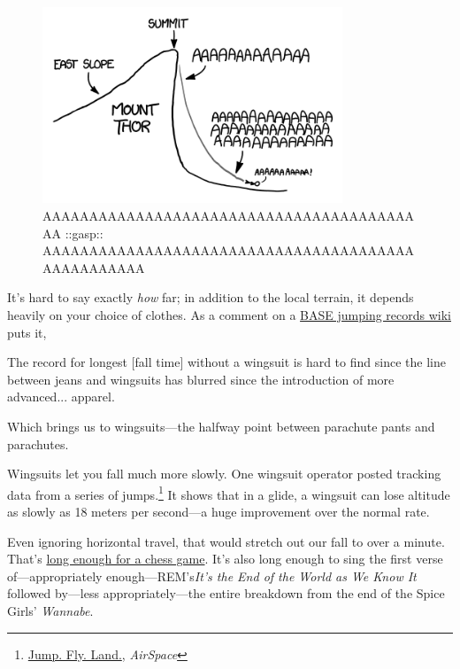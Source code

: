 {\begin{figure}[!htbp]
\centering
\includegraphics[scale=0.5, max width=0.8\textwidth]{imgs/a/51/freefall_extended.png}
\caption{AAAAAAAAAAAAAAAAAAAAAAAAAAAAAAAAAAAAAAAAAA ::gasp:: AAAAAAAAAAAAAAAAAAAAAAAAAAAAAAAAAAAAAAAAAAAAAAAAAAA}
\end{figure}

{It's hard to say exactly \emph{how} far; in addition to the local terrain, it depends heavily on your choice of clothes. As a comment on a \href{http://www.blincmagazine.com/forum/wiki/Records}{BASE jumping records wiki} puts it,}

{The record for longest [fall time] without a wingsuit is hard to find since the line between jeans and wingsuits has blurred since the introduction of more advanced... apparel.}

{Which brings us to wingsuits—the halfway point between parachute pants and parachutes.}

{Wingsuits let you fall much more slowly. One wingsuit operator posted tracking data from a series of jumps.{\footnote{ \href{http://www.airspacemag.com/flight-today/Jump-Fly-Land.html}{Jump. Fly. Land.}, \emph{AirSpace} } } It shows that in a glide, a wingsuit can lose altitude as slowly as 18 meters per second—a huge improvement over the normal rate.}

{Even ignoring horizontal travel, that would stretch out our fall to over a minute. That's \href{http://www.youtube.com/watch?v=Bzrap8Vtyq8}{long enough for a chess game}. It's also long enough to sing the first verse of—appropriately enough—REM's\emph{It's the End of the World as We Know It} followed by—less appropriately—the entire breakdown from the end of the Spice Girls' \emph{Wannabe}.}

}
